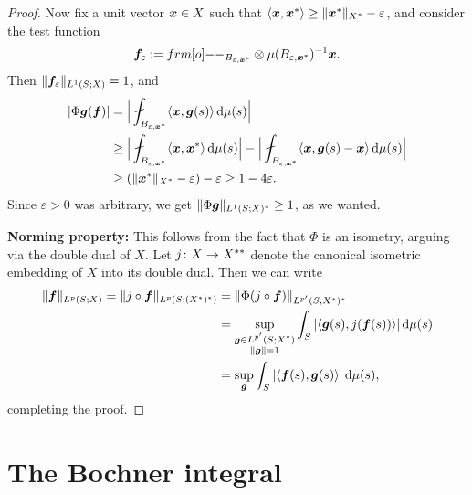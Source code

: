 \begin{proof}
  Now fix a unit vector $\bm{x} \in X$ such that $\langle \bm{x}, \bm{x}^* \rangle \geq \|\bm{x}^*\|_{X^*} - \varepsilon$, and consider the test function
  \begin{equation*}
    \mb{f}_{\varepsilon} := \1_{B_{\varepsilon, \mb{x}^*}} \otimes \mu(B_{\varepsilon, \mb{x}^*})^{-1} \mb{x}.
  \end{equation*}
  Then $\|\bm{f}_{\varepsilon}\|_{L^1(S;X)} = 1$, and
  \begin{equation*}
    \begin{aligned}
      |\Phi \mb{g}(\mb{f})| &=  \Big| \fint_{B_{\varepsilon, \mb{x}^*}} \langle \mb{x}, \mb{g}(s) \rangle \, \dd\mu(s) \Big| \\
      &\geq \Big| \fint_{B_{\varepsilon, \mb{x}^*}} \langle \mb{x}, \mb{x}^* \rangle \, \dd\mu(s) \Big| - \Big| \fint_{B_{\varepsilon, \mb{x}^*}} \langle \mb{x}, \mb{g}(s) - \mb{x} \rangle  \, \dd\mu(s) \Big| \\
      &\geq (\|\mb{x}^*\|_{X^*} - \varepsilon) - \varepsilon \geq 1 - 4\varepsilon.
    \end{aligned}
  \end{equation*}
  Since $\varepsilon > 0$ was arbitrary, we get $\|\Phi \bm{g}\|_{L^1(S;X)^*} \geq 1$, as we wanted.

  \textbf{Norming property:}
  This follows from the fact that $\Phi$ is an isometry, arguing via the double dual of $X$.
  Let $j \colon X \rightarrow X^{**}$ denote the canonical isometric embedding of $X$ into its double dual.
  Then we can write
  \begin{equation*}
    \begin{aligned}
      \|\bm{f}\|_{L^p(S;X)} = \|j \circ \bm{f}\|_{L^p(S;(X^*)^*)} &= \|\Phi (j \circ \bm{f})\|_{L^{p'}(S; X^*)^*} \\
      &= \sup_{\substack{\bm{g} \in L^{p'}(S;X^*) \\ \|\bm{g}\| = 1}} \int_{S} |\langle \bm{g}(s) , j(\bm{f}(s)) \rangle| \, \mathrm{d}\mu(s) \\
      &= \sup_{\bm{g}} \int_{S} |\langle \bm{f}(s) , \bm{g}(s) \rangle| \, \mathrm{d}\mu(s),
    \end{aligned}
  \end{equation*}
  completing the proof.
\end{proof}

\section{The Bochner integral}


